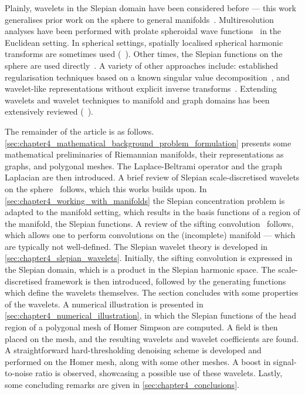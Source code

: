 Plainly, wavelets in the Slepian domain have been considered before --- this work generalises prior work on the sphere to general manifolds~\cite{Roddy2021a}.
Multiresolution analyses have been performed with prolate spheroidal wave functions~\cite{Walter2004} in the Euclidean setting.
In spherical settings, spatially localised spherical harmonic transforms are sometimes used (\eg{}~\cite{Simons1997,Wieczorek2005,Khalid2013,Khalid2013a}).
Other times, the Slepian functions on the sphere are used directly~\cite{Simons2009}.
A variety of other approaches include: established regularisation techniques based on a known singular value decomposition~\cite{Michel2017}, and wavelet-like representations without explicit inverse transforms~\cite{Simons2011}.
Extending wavelets and wavelet techniques to manifold and graph domains has been extensively reviewed (\eg{}~\cite{Dahmen1999,Coifman2006a}).

The remainder of the article is as follows.
\cref{sec:chapter4_mathematical_background_problem_formulation} presents some mathematical preliminaries of Riemannian manifolds, their representations as graphs, and polygonal meshes.
The Laplace-Beltrami operator and the graph Laplacian are then introduced.
A brief review of Slepian scale-discretised wavelets on the sphere~\cite{Roddy2021a} follows, which this works builds upon.
In \cref{sec:chapter4_working_with_manifolds} the Slepian concentration problem is adapted to the manifold setting, which results in the basis functions of a region of the manifold, \ie{} the Slepian functions.
A review of the sifting convolution~\cite{Roddy2021} follows, which allows one to perform convolutions on the (incomplete) manifold --- which are typically not well-defined.
The Slepian wavelet theory is developed in \cref{sec:chapter4_slepian_wavelets}.
Initially, the sifting convolution is expressed in the Slepian domain, which is a product in the Slepian harmonic space.
The scale-discretised framework is then introduced, followed by the generating functions which define the wavelets themselves.
The section concludes with some properties of the wavelets.
A numerical illustration is presented in \cref{sec:chapter4_numerical_illustration}, in which the Slepian functions of the head region of a polygonal mesh of Homer Simpson are computed.
A field is then placed on the mesh, and the resulting wavelets and wavelet coefficients are found.
A straightforward hard-thresholding denoising scheme is developed and performed on the Homer mesh, along with some other meshes.
A boost in signal-to-noise ratio is observed, showcasing a possible use of these wavelets.
Lastly, some concluding remarks are given in \cref{sec:chapter4_conclusions}.

